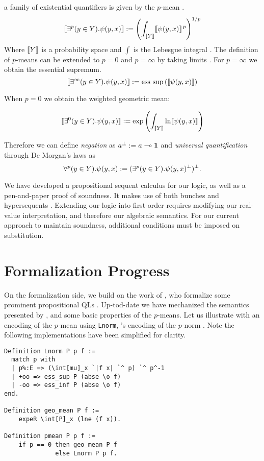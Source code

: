 \documentclass[sigplan, screen, review, nonacm]{acmart}
\begin{document}
a family of existential quantifiers is given by the $p$-mean \citep{capucci2024quantifiers}.
\begin{equation*}
        \llbracket \exists^{p}(y \in Y).\psi(y, x) \rrbracket := \left(\int_{\llbracket Y \rrbracket} \llbracket \psi(y,x) \rrbracket^{\,p}\right)^{1/p}
    \end{equation*}
Where $\llbracket Y \rrbracket$ is a probability space and $\int{}$ is the Lebesgue integral \citep{mitrinovic1970analytic}.
The definition of $p$-means can be extended to $p=0$ and $p=\infty$ by taking limits \cite{capucci2024quantifiers}. For $p=\infty$ we obtain the essential supremum. 
\begin{equation*}
        \llbracket \exists^{\infty}(y \in Y).\psi(y, x) \rrbracket := \mathrm{ess}\, \sup\,(\llbracket \psi(y, x) \rrbracket)
\end{equation*}

When $p = 0$ we obtain the weighted geometric mean:

\begin{equation*}
        \llbracket \exists^{0}(y \in Y).\psi(y,x) \rrbracket := \exp \left(\int_{\llbracket Y \rrbracket} \ln \llbracket \psi(y, x) \rrbracket\right)    
\end{equation*}

Therefore we can define \textit{negation} as $a ^\bot := a \multimap{} \textbf{1}$ and \textit{universal quantification} through De Morgan's laws as $$\forall^{p}(y \in Y).\psi(y, x) := (\exists^{p}(y \in Y).\psi(y, x) ^\bot) ^\bot.$$

 We have developed a propositional sequent calculus for our logic, as well as a pen-and-paper proof of soundness. It makes use of both bunches \citep{o1999logic} and hypersequents \citep{prooffuzzy}. Extending our logic into first-order requires modifying our real-value interpretation, and therefore our algebraic semantics. For our current approach to maintain soundness, additional conditions must be imposed on substitution. 

\section{Formalization Progress}

On the formalization side, we build on the work of \citeauthor{affeldt2024taming}, who formalize some prominent propositional QLs \citep{affeldt2024taming}.  Up-tod-date we have mechanized the semantics presented by \citeauthor{capucci2024quantifiers} \cite{capucci2024quantifiers}, and some basic properties of the $p$-means. Let us illustrate with an encoding of the $p$-mean using \texttt{Lnorm}, \mathcomp{}'s encoding of the $p$-norm \cite{lpspaces}. Note the following implementations have been simplified for clarity. 
\begin{verbatim}
Definition Lnorm P p f :=
  match p with
  | p%:E => (\int[mu]_x `|f x| `^ p) `^ p^-1
  | +oo => ess_sup P (abse \o f)
  | -oo => ess_inf P (abse \o f)
end.

Definition geo_mean P f :=  
    expeR \int[P]_x (lne (f x)). 

Definition pmean P p f := 
    if p == 0 then geo_mean P f 
              else Lnorm P p f.
\end{verbatim}
\end{document}

